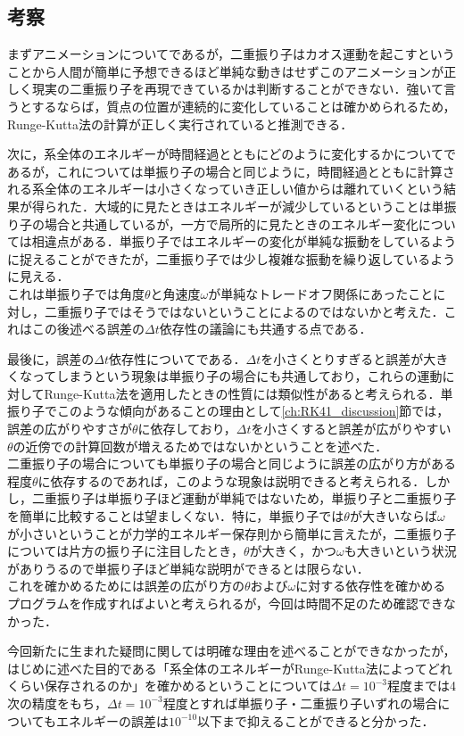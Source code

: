 \documentclass[a4paper,11pt]{jsarticle}
\begin{document}
\subsection{考察}
まずアニメーションについてであるが，二重振り子はカオス運動を起こすということから人間が簡単に予想できるほど単純な動きはせずこのアニメーションが正しく現実の二重振り子を再現できているかは判断することができない．強いて言うとするならば，質点の位置が連続的に変化していることは確かめられるため，Runge-Kutta法の計算が正しく実行されていると推測できる．\par
次に，系全体のエネルギーが時間経過とともにどのように変化するかについてであるが，これについては単振り子の場合と同じように，時間経過とともに計算される系全体のエネルギーは小さくなっていき正しい値からは離れていくという結果が得られた．大域的に見たときはエネルギーが減少しているということは単振り子の場合と共通しているが，一方で局所的に見たときのエネルギー変化については相違点がある．単振り子ではエネルギーの変化が単純な振動をしているように捉えることができたが，二重振り子では少し複雑な振動を繰り返しているように見える．\\
これは単振り子では角度\(\theta\)と角速度\(\omega\)が単純なトレードオフ関係にあったことに対し，二重振り子ではそうではないということによるのではないかと考えた．これはこの後述べる誤差の\(\Delta t\)依存性の議論にも共通する点である．\par
最後に，誤差の\(\Delta t\)依存性についてである．\(\Delta t\)を小さくとりすぎると誤差が大きくなってしまうという現象は単振り子の場合にも共通しており，これらの運動に対してRunge-Kutta法を適用したときの性質には類似性があると考えられる．単振り子でこのような傾向があることの理由として\ref{ch:RK41_discussion}節では，誤差の広がりやすさが\(\theta\)に依存しており，\(\Delta t\)を小さくすると誤差が広がりやすい\(\theta\)の近傍での計算回数が増えるためではないかということを述べた．\\
二重振り子の場合についても単振り子の場合と同じように誤差の広がり方がある程度\(\theta\)に依存するのであれば，このような現象は説明できると考えられる．しかし，二重振り子は単振り子ほど運動が単純ではないため，単振り子と二重振り子を簡単に比較することは望ましくない．特に，単振り子では\(\theta\)が大きいならば\(\omega\)が小さいということが力学的エネルギー保存則から簡単に言えたが，二重振り子については片方の振り子に注目したとき，\(\theta\)が大きく，かつ\(\omega\)も大きいという状況がありうるので単振り子ほど単純な説明ができるとは限らない．\\
これを確かめるためには誤差の広がり方の\(\theta\)および\(\omega\)に対する依存性を確かめるプログラムを作成すればよいと考えられるが，今回は時間不足のため確認できなかった．\par
今回新たに生まれた疑問に関しては明確な理由を述べることができなかったが，はじめに述べた目的である「系全体のエネルギーがRunge-Kutta法によってどれくらい保存されるのか」を確かめるということについては\(\Delta t = 10^{-3}\)程度までは4次の精度をもち，\(\Delta t =10^{-3}\)程度とすれば単振り子・二重振り子いずれの場合についてもエネルギーの誤差は\(10^{-10}\)以下まで抑えることができると分かった．
\newpage
\end{document}
